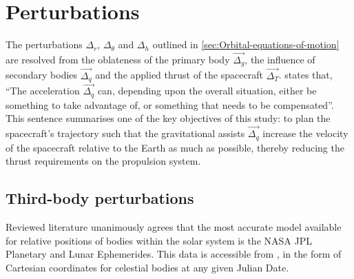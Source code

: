 \section{Perturbations} \label{sec:Perturbations}

The perturbations $\Delta_r$, $\Delta_\theta$ and $\Delta_h$ outlined in \autoref{sec:Orbital-equations-of-motion} are resolved from the oblateness of the primary body $\vec{\Delta_g}$, the influence of secondary bodies $\vec{\Delta_q}$ and the applied thrust of the spacecraft $\vec{\Delta_T}$. \textcite{Erb_thesis} states that, \enquote{The acceleration $\vec{\Delta_q}$ can, depending upon the overall situation, either be something to take advantage of, or something that needs to be compensated}. This sentence summarises one of the key objectives of this study: to plan the spacecraft's trajectory such that the gravitational assists $\vec{\Delta_q}$ increase the velocity of the spacecraft relative to the Earth as much as possible, thereby reducing the thrust requirements on the propulsion system.



\subsection{Third-body perturbations} \label{sub:Ephemerides}

Reviewed literature unanimously agrees that the most accurate model available for relative positions of bodies within the solar system is the NASA JPL Planetary and Lunar Ephemerides. This data is accessible from \textcite{web_JetPropulsionLaboratory2004}, in the form of Cartesian coordinates for celestial bodies at any given Julian Date.

